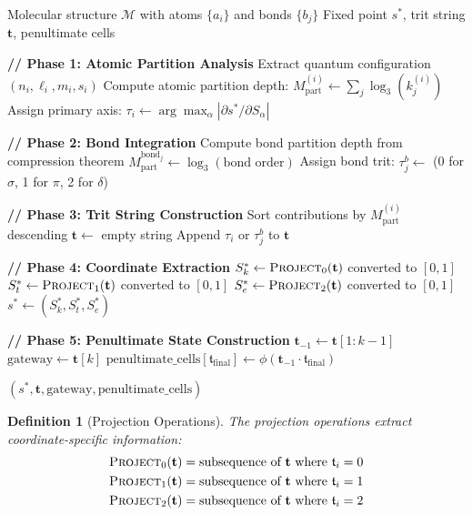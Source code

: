 \documentclass[twocolumn,10pt,a4paper]{article}
\newtheorem{definition}[theorem]{Definition}
\newcommand{\Sk}{S_k}
\newcommand{\St}{S_t}
\newcommand{\Se}{S_e}
\newcommand{\trit}{\mathfrak{t}}
\newcommand{\Mpart}{M_{\text{part}}}
\begin{document}
\begin{algorithm}[H]
\caption{Molecular Encoder}
\label{alg:encoder}
\begin{algorithmic}[1]
\Require Molecular structure $\mathcal{M}$ with atoms $\{a_i\}$ and bonds $\{b_j\}$
\Ensure Fixed point $s^*$, trit string $\mathbf{t}$, penultimate cells


\State \textbf{// Phase 1: Atomic Partition Analysis}
    \State Extract quantum configuration $(n_i, \ell_i, m_i, s_i)$
    \State Compute atomic partition depth: $\Mpart^{(i)} \gets \sum_j \log_3(k_j^{(i)})$
    \State Assign primary axis: $\tau_i \gets \arg\max_\alpha |\partial s^* / \partial S_\alpha|$
\EndFor

\State \textbf{// Phase 2: Bond Integration}
    \State Compute bond partition depth from compression theorem
    \State $\Mpart^{\text{bond}_j} \gets \log_3(\text{bond order})$
    \State Assign bond trit: $\tau_j^b \gets$ (0 for $\sigma$, 1 for $\pi$, 2 for $\delta$)
\EndFor

\State \textbf{// Phase 3: Trit String Construction}
\State Sort contributions by $\Mpart^{(i)}$ descending 
\State $\mathbf{t} \gets$ empty string
    \State Append $\tau_i$ or $\tau_j^b$ to $\mathbf{t}$
\EndFor

\State \textbf{// Phase 4: Coordinate Extraction}
\State $\Sk^* \gets \textsc{Project}_0(\mathbf{t})$ converted to $[0,1]$
\State $\St^* \gets \textsc{Project}_1(\mathbf{t})$ converted to $[0,1]$
\State $\Se^* \gets \textsc{Project}_2(\mathbf{t})$ converted to $[0,1]$
\State $s^* \gets (\Sk^*, \St^*, \Se^*)$

\State \textbf{// Phase 5: Penultimate State Construction}
\State $\mathbf{t}_{-1} \gets \mathbf{t}[1:k-1]$ 
\State $\text{gateway} \gets \mathbf{t}[k]$
\For{$\trit_{\text{final}} \in \{0, 1, 2\}$}
    \State $\text{penultimate\_cells}[\trit_{\text{final}}] \gets \phi(\mathbf{t}_{-1} \cdot \trit_{\text{final}})$
\EndFor

\State \Return $(s^*, \mathbf{t}, \text{gateway}, \text{penultimate\_cells})$
\EndProcedure

\end{algorithmic}
\end{algorithm}

\begin{definition}[Projection Operations]
The projection operations extract coordinate-specific information:
\begin{align}
\textsc{Project}_0(\mathbf{t}) &= \text{subsequence of } \mathbf{t} \text{ where } \trit_i = 0 \\
\textsc{Project}_1(\mathbf{t}) &= \text{subsequence of } \mathbf{t} \text{ where } \trit_i = 1 \\
\textsc{Project}_2(\mathbf{t}) &= \text{subsequence of } \mathbf{t} \text{ where } \trit_i = 2
\end{align}
\end{definition}
\end{document}
